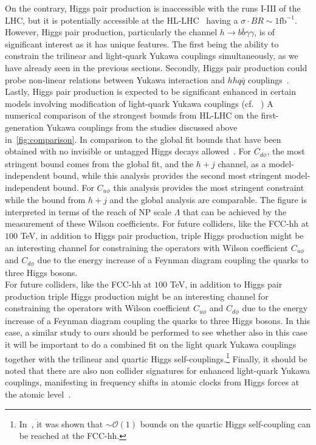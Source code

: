 On the contrary, Higgs pair production is inaccessible with the runs I-III of the LHC, but it is potentially accessible at the HL-LHC~\cite{Binoth:2006ym} having a $ \sigma \cdot BR\sim 1\mathrm{fb}^{-1}$. However, Higgs pair production, particularly the channel $h \to b \bar b \gamma \gamma $, is of significant interest as it has unique features. The first being the ability to constrain the trilinear and light-quark Yukawa couplings simultaneously, as we have already seen in the previous sections. Secondly, Higgs pair production could probe non-linear relations between Yukawa interaction and $hh q\bar q$ couplings~\cite{Contino:2012xk}. Lastly, Higgs pair production is expected to be significant enhanced in certain models involving modification of light-quark Yukawa couplings (cf. ~\cite{Bar-Shalom:2018rjs,Bauer:2017cov,Egana-Ugrinovic:2021uew})
A numerical comparison of the strongest bounds from HL-LHC on the first-generation Yukawa couplings from the studies discussed above in~\autoref{fig:comparison}. In comparison to the global fit bounds that have been obtained with no invisible or untagged Higgs decays allowed~\cite{deBlas:2019rxi}. For $C_{d\phi}$, the most stringent bound comes from the global fit, and the $h+j$ channel, as a model-independent bound, while this analysis provides the second most stringent model-independent bound. For $C_{u\phi}$ this analysis provides the most stringent constraint while the bound from $h+j$ and the global analysis are comparable. The figure is interpreted in terms of the reach of NP scale $\Lambda$ that can be achieved by the measurement of these Wilson coefficients. For future colliders, like the FCC-hh at $100$ TeV, in addition to Higgs pair production, triple Higgs production might be an interesting channel for constraining the operators with Wilson coefficient $C_{u\phi}$ and $C_{d\phi}$ due to the energy increase of a Feynman diagram coupling the quarks to three Higgs bosons.\\
For future colliders, like the FCC-hh at $100$ TeV, in addition to Higgs pair production triple Higgs production might be an interesting channel for constraining the operators with Wilson coefficient $C_{u\phi}$ and $C_{d\phi}$ due to the energy increase of a Feynman diagram coupling the quarks to three Higgs bosons.   In this case, a similar study to ours should be performed to see whether also in this case it will be important to do a combined fit on the light quark Yukawa couplings together with the trilinear and quartic Higgs self-couplings.\footnote{In~\cite{Papaefstathiou:2047255}, it was shown that $\sim \mathcal{O}(1)$ bounds on the quartic Higgs self-coupling can be reached at the FCC-hh.}
Finally, it should be noted that there are also non collider signatures for enhanced light-quark Yukawa couplings, manifesting in frequency shifts in atomic clocks from Higgs forces at the atomic level~\cite{Delaunay:2016brc}. 
